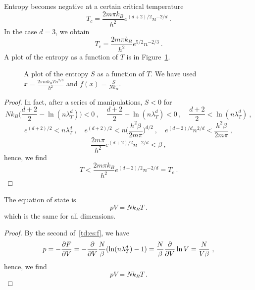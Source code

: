     Entropy becomes negative at a certain critical temperature
    \begin{equation}\label{ex:negs1}
        T_c = \frac{2 m \pi k_B}{h^2} e^{(d+2)/2} n^{-2/d} ~.
    \end{equation}
    In the case $d=3$, we obtain 
    \begin{equation*}
        T_c = \frac{2 m \pi k_B}{h^2} e^{5/2} n^{-2/3} ~.
    \end{equation*}
    A plot of the entropy as a function of $T$ is in Figure~\ref{fig:c:ent}.
    \begin{figure}
        \centering
        \caption{A plot of the entropy $S$ as a function of $T$. We have used $x = \frac{2 \pi m k_B T n^{2/3}}{h^2}$ and $f(x) = \frac{S}{N k_B}$.}
        \label{fig:c:ent}
    \end{figure}
    \begin{proof}
        In fact, after a series of manipulations, $S < 0$ for 
        \begin{equation*}
            N k_B \Big ( \frac{d+2}{2} - \ln (n \lambda_T^d) \Big ) < 0 ~, \quad \frac{d+2}{2} - \ln (n \lambda_T^d) < 0 ~, \quad \frac{d+2}{2} < \ln (n \lambda_T^d) ~,
        \end{equation*}
        \begin{equation*}
            e^{(d+2)/2} < n \lambda_T^d  ~, \quad e^{(d+2)/2} < n \Big ( \frac{h^2 \beta}{2 m \pi} \Big )^{d/2}  ~, \quad e^{(d+2)/d} n^{2/d} < \frac{h^2 \beta}{2 m \pi} ~,
        \end{equation*}
        \begin{equation*}
            \frac{2 m \pi}{h^2} e^{(d+2)/2} n^{-2/d} < \beta ~,
        \end{equation*}
        hence, we find
        \begin{equation*}
            T < \frac{2 m \pi k_B}{h^2} e^{(d+2)/2} n^{-2/d} = T_c ~.
        \end{equation*}
    \end{proof}
    The equation of state is 
    \begin{equation}\label{ides}
        p V = N k_B T ~.
    \end{equation}
    which is the same for all dimensions.
    \begin{proof}
        By the second of~\eqref{td:es:f}, we have
        \begin{equation*}
            p = - \frac{\partial F}{\partial V} = - \frac{\partial}{\partial V} \frac{N}{\beta} (\ln (n \lambda_T^d) - 1) = \frac{N}{\beta} \frac{\partial}{\partial V} \ln V = \frac{N}{V \beta} ~,
        \end{equation*}
        hence, we find
        \begin{equation*}
            p V = N k_B T ~.
        \end{equation*}
    \end{proof}
